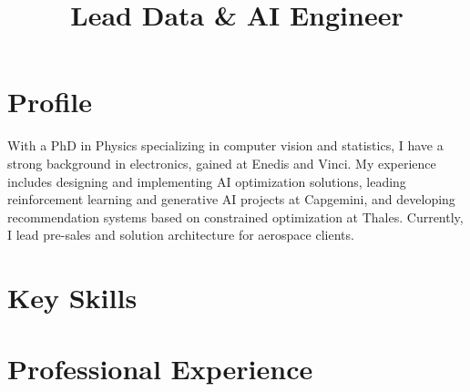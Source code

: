 \documentclass[10pt,a4paper,sans]{moderncv}
\title{Lead Data \& AI Engineer}
\begin{document}
\makecvtitle
\vspace*{-10mm}

\section{Profile}


With a PhD in Physics specializing in computer vision and statistics, I have a strong background in electronics, gained at Enedis and Vinci. My experience includes designing and implementing AI optimization solutions, leading reinforcement learning and generative AI projects at Capgemini, and developing recommendation systems based on constrained optimization at Thales. Currently, I lead pre-sales and solution architecture for aerospace clients.

\section{Key Skills}


\section{Professional Experience}
\end{document}
